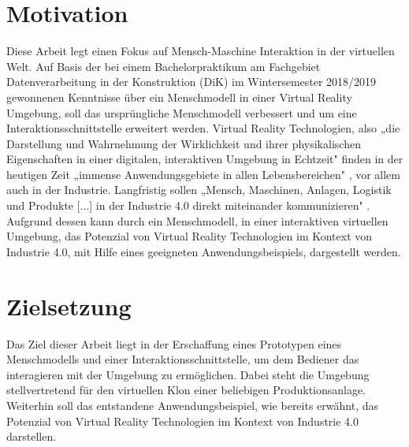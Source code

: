 \section{Motivation}\label{sec:Motivation}
Diese Arbeit legt einen Fokus auf Mensch-Maschine Interaktion in der virtuellen Welt. Auf Basis der bei einem Bachelorpraktikum am Fachgebiet Datenverarbeitung in der Konstruktion (DiK) im Wintersemester 2018/2019 gewonnenen Kenntnisse über ein Menschmodell in einer Virtual Reality Umgebung, soll das ursprüngliche Menschmodell verbessert und um eine Interaktionsschnittstelle erweitert werden.
\newline\newline
Virtual Reality Technologien, also „die Darstellung und Wahrnehmung der Wirklichkeit und ihrer physikalischen Eigenschaften in einer digitalen, interaktiven Umgebung in Echtzeit" \cite[S.1]{4} finden in der heutigen Zeit „immense Anwendungsgebiete in allen Lebensbereichen" \cite[S.1]{4}, vor allem auch in der Industrie. Langfristig sollen „Mensch, Maschinen, Anlagen, Logistik und Produkte [...] in der Industrie 4.0 direkt miteinander kommunizieren" \cite[S.2]{4}.
\newline\newline
Aufgrund dessen kann durch ein Menschmodell, in einer interaktiven virtuellen Umgebung, das Potenzial von Virtual Reality Technologien im Kontext von Industrie 4.0, mit Hilfe eines geeigneten Anwendungsbeispiels, dargestellt werden.

\section{Zielsetzung}\label{sec:Zielsetzung}
Das Ziel dieser Arbeit liegt in der Erschaffung eines Prototypen eines Menschmodells und einer Interaktionsschnittstelle, um dem Bediener das interagieren mit der Umgebung zu ermöglichen. Dabei steht die Umgebung stellvertretend für den virtuellen Klon einer beliebigen Produktionsanlage. Weiterhin soll das entstandene Anwendungsbeispiel, wie bereits erwähnt, das Potenzial von Virtual Reality Technologien im Kontext von Industrie 4.0 darstellen.

